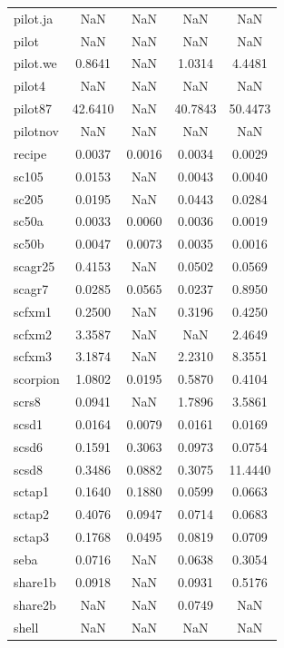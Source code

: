 \begin{longtable}{lcccc}
pilot.ja &      NaN &      NaN &      NaN &      NaN \\
pilot    &      NaN &      NaN &      NaN &      NaN \\
pilot.we &   0.8641 &      NaN &   1.0314 &   4.4481 \\
pilot4   &      NaN &      NaN &      NaN &      NaN \\
pilot87  &  42.6410 &      NaN &  40.7843 &  50.4473 \\
pilotnov &      NaN &      NaN &      NaN &      NaN \\
recipe   &   0.0037 &   0.0016 &   0.0034 &   0.0029 \\
sc105    &   0.0153 &      NaN &   0.0043 &   0.0040 \\
sc205    &   0.0195 &      NaN &   0.0443 &   0.0284 \\
sc50a    &   0.0033 &   0.0060 &   0.0036 &   0.0019 \\
sc50b    &   0.0047 &   0.0073 &   0.0035 &   0.0016 \\
scagr25  &   0.4153 &      NaN &   0.0502 &   0.0569 \\
scagr7   &   0.0285 &   0.0565 &   0.0237 &   0.8950 \\
scfxm1   &   0.2500 &      NaN &   0.3196 &   0.4250 \\
scfxm2   &   3.3587 &      NaN &      NaN &   2.4649 \\
scfxm3   &   3.1874 &      NaN &   2.2310 &   8.3551 \\
scorpion &   1.0802 &   0.0195 &   0.5870 &   0.4104 \\
scrs8    &   0.0941 &      NaN &   1.7896 &   3.5861 \\
scsd1    &   0.0164 &   0.0079 &   0.0161 &   0.0169 \\
scsd6    &   0.1591 &   0.3063 &   0.0973 &   0.0754 \\
scsd8    &   0.3486 &   0.0882 &   0.3075 &  11.4440 \\
sctap1   &   0.1640 &   0.1880 &   0.0599 &   0.0663 \\
sctap2   &   0.4076 &   0.0947 &   0.0714 &   0.0683 \\
sctap3   &   0.1768 &   0.0495 &   0.0819 &   0.0709 \\
seba     &   0.0716 &      NaN &   0.0638 &   0.3054 \\
share1b  &   0.0918 &      NaN &   0.0931 &   0.5176 \\
share2b  &      NaN &      NaN &   0.0749 &      NaN \\
shell    &      NaN &      NaN &      NaN &      NaN \\

\end{longtable}
